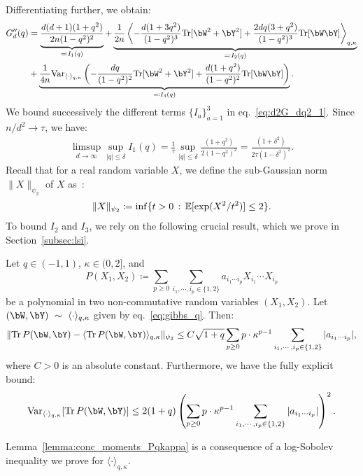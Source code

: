 Differentiating further, we obtain:
\begin{align}\label{eq:d2G_dq2_1}
    \nonumber
    G_d''(q) &= \underbrace{\frac{d(d+1) (1+q^2)}{2n (1-q^2)^2}}_{\eqqcolon I_1(q)}
    + \underbrace{\frac{1}{2n} \left\langle -\frac{d(1+3q^2)}{(1-q^2)^3} \Tr[\bW^2+\bY^2] 
    + \frac{2dq(3+q^2)}{(1-q^2)^3} \Tr[\bW\bY] \right\rangle_{q,\kappa}}_{\eqqcolon I_2(q)} \\ 
    &+ \underbrace{\frac{1}{4n} \textrm{Var}_{\langle \cdot \rangle_{q,\kappa}} \left(-\frac{dq}{(1-q^2)^2} \Tr[\bW^2+\bY^2] 
    + \frac{d(1+q^2)}{(1-q^2)^2} \Tr[\bW\bY]\right)}_{\eqqcolon I_3(q)}.
\end{align}
We bound successively the different terms $\{I_a\}_{a=1}^3$ in eq.~\eqref{eq:d2G_dq2_1}. 
Since $n/d^2 \to \tau$, we have:
\begin{align}\label{eq:ub_I1}
   \limsup_{d \to \infty}\sup_{|q| \leq \delta} I_1(q) = \frac{1}{\tau} \sup_{|q| \leq \delta }\frac{(1+q^2)}{2(1-q^2)^2} 
    = \frac{(1+\delta^2)}{2 \tau(1-\delta^2)^2}.
\end{align}
Recall that for a real random variable $X$, we define the sub-Gaussian norm $\|X\|_{\psi_2}$ of $X$ as~\citep{vershynin2018high}:
\begin{align*}
    \|X\|_{\psi_2} \coloneqq \inf \{t > 0 \, : \, \mathbb{E}[\exp(X^2/t^2)] \leq 2\}. 
\end{align*}
To bound $I_2$ and $I_3$, we rely on the following crucial result, which we prove in Section~\ref{subsec:lsi}.
\begin{lemma}
    \label{lemma:conc_moments_Pqkappa}
    Let $q \in (-1,1)$, $\kappa \in (0,2]$, and 
    \begin{equation*}
    P(X_1, X_2) \coloneqq \sum_{p\geq 0}\sum_{i_1, \cdots, i_p \in \{1,2\}} a_{i_1 \cdots i_p} X_{i_1} \cdots X_{i_p}
    \end{equation*}
    be a polynomial 
    in two non-commutative random variables $(X_1, X_2)$.
    Let $(\bW, \bY)~\sim~\langle \cdot \rangle_{q,\kappa}$ given by eq.~\eqref{eq:gibbs_q}.
    Then: 
    \begin{equation*}
    \|\Tr \, P(\bW, \bY) - \langle \Tr \, P(\bW, \bY) \rangle_{q,\kappa} \|_{\psi_2} \leq C \sqrt{1+q} 
    \sum_{p\geq 0} p \cdot \kappa^{p-1}\sum_{i_1, \cdots, i_p \in \{1,2\}} |a_{i_1 \cdots i_p}|,
    \end{equation*}
    where $C > 0$ is an absolute constant. Furthermore, we have the fully explicit bound:
    \begin{equation}\label{eq:var_PWY}
        \Var_{\langle \cdot \rangle_{q,\kappa}} [\Tr \, P(\bW, \bY)] \leq 
         2(1+q)
        \left(\sum_{p\geq 0} p \cdot \kappa^{p-1}\sum_{i_1, \cdots, i_p \in \{1,2\}} |a_{i_1 \cdots i_p}|\right)^2.
    \end{equation}
\end{lemma}
\noindent
Lemma~\ref{lemma:conc_moments_Pqkappa} is a consequence of a log-Sobolev inequality we prove for $\langle \cdot \rangle_{q,\kappa}$.

